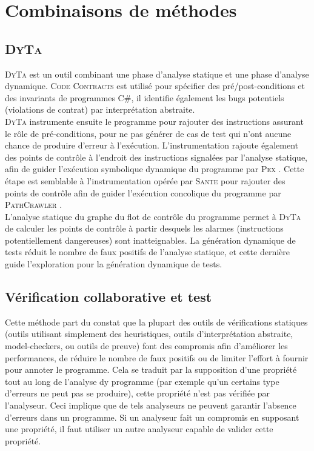 
\chapter{Combinaisons de méthodes}

\section{\textsc{DyTa}}

\textsc{DyTa} \cite{DyTa} est un outil combinant une phase d'analyse statique et
une phase d'analyse dynamique. \textsc{Code Contracts} \cite{CodeContracts} est
utilisé pour spécifier des pré/post-conditions et des invariants de programmes
C\#, il identifie également les bugs potentiels (violations de contrat) par
interprétation abstraite.\\

\textsc{DyTa} instrumente ensuite le programme pour rajouter des instructions
assurant le rôle de pré-conditions, pour ne pas générer de cas de test qui n'ont
aucune chance de produire d'erreur à l'exécution. L'instrumentation rajoute
également des points de contrôle à l'endroit des instructions signalées par
l'analyse statique, afin de guider l'exécution symbolique dynamique du programme
par \textsc{Pex} \cite{PEX}. Cette étape est semblable à l'instrumentation
opérée par \textsc{Sante} \cite{SANTE} pour rajouter des points de contrôle afin
de guider l'exécution concolique du programme par \textsc{PathCrawler}
\cite{PathCrawler}.\\

L'analyse statique du graphe du flot de contrôle du programme permet à
\textsc{DyTa} de calculer les points de contrôle à partir desquels les alarmes
(instructions potentiellement dangereuses) sont inatteignables. La génération
dynamique de tests réduit le nombre de faux positifs de l'analyse statique, et
cette dernière guide l'exploration pour la génération dynamique de tests.

\section{Vérification collaborative et test}

Cette méthode \cite{collaborative-verification} part du constat que la plupart
des outils de vérifications statiques (outils utilisant simplement des
heuristiques, outils d'interprétation abstraite, model-checkers, ou outils de
preuve) font des compromis afin d'améliorer les performances, de réduire le
nombre de faux positifs ou de limiter l'effort à fournir pour annoter le
programme. Cela se traduit par la supposition d'une propriété tout au long de
l'analyse dy programme (par exemple qu'un certains type d'erreurs ne peut pas
se produire), cette propriété n'est pas vérifiée par l'analyseur. Ceci
implique que de tels analyseurs ne peuvent garantir l'absence d'erreurs dans un
programme. Si un analyseur fait un compromis en supposant une propriété, il
faut utiliser un autre analyseur capable de valider cette propriété.\\

